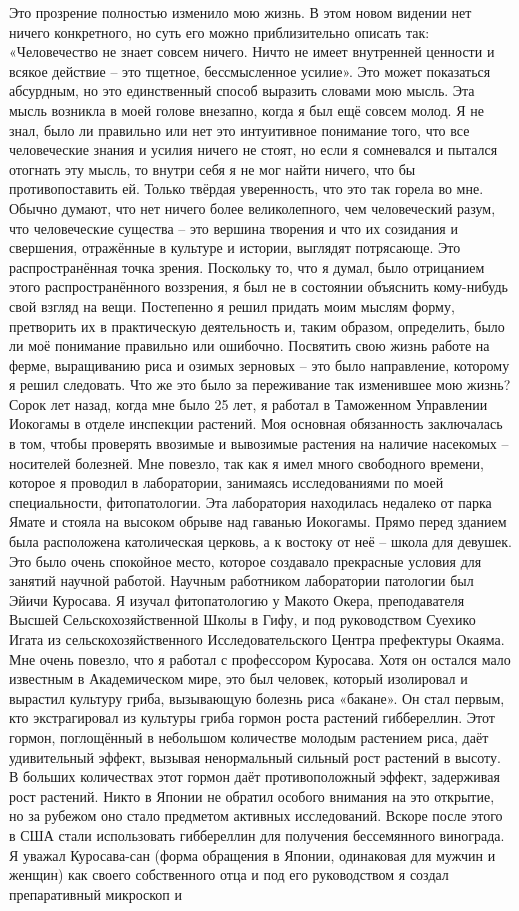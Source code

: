 \documentclass[a4paper]{book}
\begin{document}
Это прозрение полностью изменило мою жизнь. В этом новом видении нет ничего
конкретного, но суть его можно приблизительно описать так: «Человечество не знает совсем
ничего. Ничто не имеет внутренней ценности и всякое действие – это тщетное,
бессмысленное усилие». Это может показаться абсурдным, но это единственный способ
выразить словами мою мысль.
Эта мысль возникла в моей голове внезапно, когда я был ещё совсем молод. Я не знал,
было ли правильно или нет это интуитивное понимание того, что все человеческие знания и
усилия ничего не стоят, но если я сомневался и пытался отогнать эту мысль, то внутри себя я
не мог найти ничего, что бы противопоставить ей. Только твёрдая уверенность, что это так
горела во мне.
Обычно думают, что нет ничего более великолепного, чем человеческий разум, что
человеческие существа – это вершина творения и что их созидания и свершения, отражённые
в культуре и истории, выглядят потрясающе. Это распространённая точка зрения.
Поскольку то, что я думал, было отрицанием этого распространённого воззрения, я был
не в состоянии объяснить кому-нибудь свой взгляд на вещи. Постепенно я решил придать
моим мыслям форму, претворить их в практическую деятельность и, таким образом,
определить, было ли моё понимание правильно или ошибочно. Посвятить свою жизнь
работе на ферме, выращиванию риса и озимых зерновых – это было направление, которому я
решил следовать.
Что же это было за переживание так изменившее мою жизнь?
Сорок лет назад, когда мне было 25 лет, я работал в Таможенном Управлении Иокогамы
в отделе инспекции растений. Моя основная обязанность заключалась в том, чтобы
проверять ввозимые и вывозимые растения на наличие насекомых – носителей болезней.
Мне повезло, так как я имел много свободного времени, которое я проводил в лаборатории,
занимаясь исследованиями по моей специальности, фитопатологии. Эта лаборатория
находилась недалеко от парка Ямате и стояла на высоком обрыве над гаванью Иокогамы.
Прямо перед зданием была расположена католическая церковь, а к востоку от неё – школа
для девушек. Это было очень спокойное место, которое создавало прекрасные условия для
занятий научной работой.
Научным работником лаборатории патологии был Эйичи Куросава. Я изучал
фитопатологию у Макото Окера, преподавателя Высшей Сельскохозяйственной Школы в
Гифу, и под руководством Суехико Игата из сельскохозяйственного Исследовательского
Центра префектуры Окаяма.
Мне очень повезло, что я работал с профессором Куросава. Хотя он остался мало
известным в Академическом мире, это был человек, который изолировал и вырастил
культуру гриба, вызывающую болезнь риса «бакане». Он стал первым, кто экстрагировал из
культуры гриба гормон роста растений гиббереллин. Этот гормон, поглощённый в
небольшом количестве молодым растением риса, даёт удивительный эффект, вызывая
ненормальный сильный рост растений в высоту. В больших количествах этот гормон даёт
противоположный эффект, задерживая рост растений. Никто в Японии не обратил особого
внимания на это открытие, но за рубежом оно стало предметом активных исследований.
Вскоре после этого в США стали использовать гиббереллин для получения бессемянного
винограда.
Я уважал Куросава-сан (форма обращения в Японии, одинаковая для мужчин и женщин)
как своего собственного отца и под его руководством я создал препаративный микроскоп и
\end{document}
